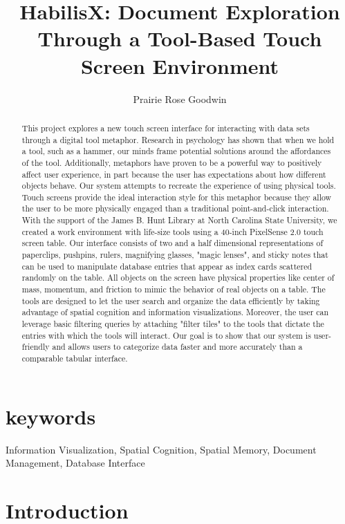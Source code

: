 \documentclass{article}
\begin{document}
\title{HabilisX: Document Exploration Through a Tool-Based Touch Screen Environment }
\author{Prairie Rose Goodwin}
\date{}
\maketitle
\begin{abstract}
This project explores a new touch screen interface for interacting with data sets through a digital tool metaphor.  Research in psychology has shown that when we hold a tool, such as a hammer, our minds frame potential solutions around the affordances of the tool.  Additionally, metaphors have proven to be a powerful way to positively affect user experience, in part because the user has expectations about how different objects behave.  Our system attempts to recreate the experience of using physical tools. Touch screens provide the ideal interaction style for this metaphor because they allow the user to be more physically engaged than a traditional point-and-click interaction. With the support of the James B. Hunt Library at North Carolina State University, we created a work environment with life-size tools using a 40-inch PixelSense 2.0 touch screen table.  Our interface consists of two and a half dimensional representations of paperclips, pushpins, rulers, magnifying glasses, "magic lenses", and sticky notes that can be used to manipulate database entries that appear as index cards scattered randomly on the table.  All objects on the screen have physical properties like center of mass, momentum, and friction to mimic the behavior of real objects on a table.  The tools are designed to let the user search and organize the data efficiently by taking advantage of spatial cognition and information visualizations.  Moreover, the user can leverage basic filtering queries by attaching "filter tiles" to the tools that dictate the entries with which the tools will interact.  Our goal is to show that our system is user-friendly and allows users to categorize data faster and more accurately than a comparable tabular interface.
\end{abstract}
\section{keywords}
Information Visualization, Spatial Cognition, Spatial Memory, Document Management, Database Interface

\section{Introduction}	
\end{document}
